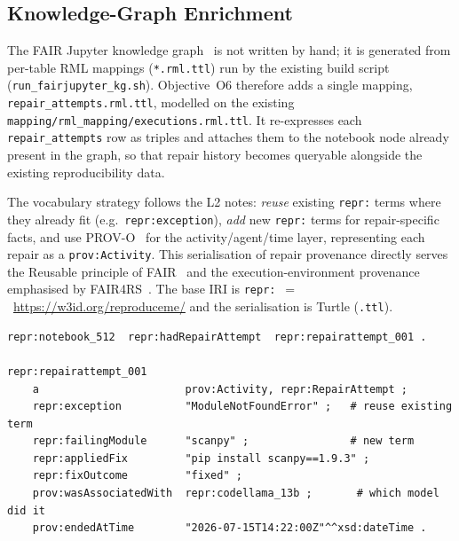 \subsection{Knowledge-Graph Enrichment}
\label{subsec:kg}

The FAIR Jupyter knowledge graph~\cite{samuel2024fairjupyter} %
is not written by hand; it is generated from per-table RML mappings
(\texttt{*.rml.ttl}) run by the existing build script
(\texttt{run\_fairjupyter\_kg.sh}). Objective~O6 therefore adds a single
mapping, \texttt{repair\_attempts.rml.ttl}, modelled on the existing
\texttt{mapping/rml\_mapping/executions.rml.ttl}. It re-expresses each
\texttt{repair\_attempts} row as triples and attaches them to the notebook
node already present in the graph, so that repair history becomes
queryable alongside the existing reproducibility data.

The vocabulary strategy follows the L2 notes: \emph{reuse} existing
\texttt{repr:} terms where they already fit (e.g.\ \texttt{repr:exception}),
\emph{add} new \texttt{repr:} terms for repair-specific facts, and use
PROV-O~\cite{provo} %
for the activity/agent/time layer, representing each repair as a
\texttt{prov:Activity}. This serialisation of repair provenance directly
serves the Reusable principle of FAIR~\cite{wilkinson2016fair} and the
execution-environment provenance emphasised by
FAIR4RS~\cite{barker2022fair4rs}. %
The base IRI is \texttt{repr:}~$=$~\url{https://w3id.org/reproduceme/} and
the serialisation is Turtle (\texttt{.ttl}).

\begin{verbatim}
repr:notebook_512  repr:hadRepairAttempt  repr:repairattempt_001 .

repr:repairattempt_001
    a                       prov:Activity, repr:RepairAttempt ;
    repr:exception          "ModuleNotFoundError" ;   # reuse existing term
    repr:failingModule      "scanpy" ;                # new term
    repr:appliedFix         "pip install scanpy==1.9.3" ;
    repr:fixOutcome         "fixed" ;
    prov:wasAssociatedWith  repr:codellama_13b ;       # which model did it
    prov:endedAtTime        "2026-07-15T14:22:00Z"^^xsd:dateTime .
\end{verbatim}

